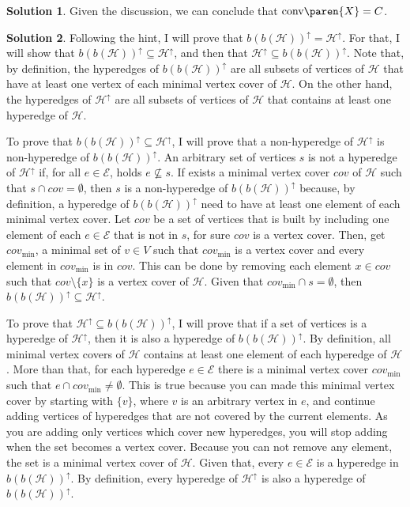 \documentclass[11pt,leqno,final]{amsart}
\theoremstyle{definition}
\newtheorem{solution}{Solution}
\begin{document}
\begin{solution}
Given the discussion, we can conclude that $\text{conv}\paren{X} = C$.


\end{solution}

\begin{solution}
Following the hint, I will prove that ${b(b(\mathcal{H}))}^{\uparrow} = \mathcal{H}^{\uparrow}$. For that, I will show that ${b(b(\mathcal{H}))}^{\uparrow} \subseteq \mathcal{H}^{\uparrow}$, and then that $\mathcal{H}^{\uparrow} \subseteq {b(b(\mathcal{H}))}^{\uparrow}$. Note that, by definition, the hyperedges of ${b(b(\mathcal{H}))}^{\uparrow}$ are all subsets of vertices of $\mathcal{H}$ that have at least one vertex of each minimal vertex cover of $\mathcal{H}$. On the other hand, the hyperedges of $\mathcal{H}^{\uparrow}$ are all subsets of vertices of $\mathcal{H}$ that contains at least one hyperedge of $\mathcal{H}$.

To prove that ${b(b(\mathcal{H}))}^{\uparrow} \subseteq \mathcal{H}^{\uparrow}$, I will prove that a non-hyperedge of $\mathcal{H}^{\uparrow}$ is non-hyperedge of ${b(b(\mathcal{H}))}^{\uparrow}$. An arbitrary set of vertices $s$ is not a hyperedge of ${\mathcal{H}}^{\uparrow}$ if, for all $e \in \mathcal{E}$, holds $e \nsubseteq s$. If exists a minimal vertex cover $cov$ of $\mathcal{H}$ such that $s \cap cov = \emptyset$, then $s$ is a non-hyperedge of $b(b(\mathcal{H}))^{\uparrow}$ because, by definition, a hyperedge of $b(b(\mathcal{H}))^{\uparrow}$ need to have at least one element of each minimal vertex cover. Let $cov$ be a set of vertices that is built by including one element of each $e \in \mathcal{E}$ that is not in $s$, for sure $cov$ is a vertex cover. Then, get $cov_{\text{min}}$, a minimal set of $v \in V$ such that $cov_{\text{min}}$ is a vertex cover and every element in $cov_{\text{min}}$ is in $cov$. This can be done by removing each element $x \in cov$ such that $cov \setminus \{x\}$ is a vertex cover of $\mathcal{H}$. Given that $cov_{\text{min}} \cap s = \emptyset$, then ${b(b(\mathcal{H}))}^{\uparrow} \subseteq \mathcal{H}^{\uparrow}$.

To prove that $\mathcal{H}^{\uparrow} \subseteq {b(b(\mathcal{H}))}^{\uparrow}$, I will prove that if a set of vertices is a hyperedge of ${\mathcal{H}}^{\uparrow}$, then it is also a hyperedge of ${b(b(\mathcal{H}))}^{\uparrow}$. By definition, all minimal vertex covers of $\mathcal{H}$ contains at least one element of each hyperedge of $\mathcal{H}$. More than that, for each hyperedge $e \in \mathcal{E}$ there is a minimal vertex cover $cov_{\text{min}}$ such that $e \cap cov_{\text{min}} \neq \emptyset$. This is true because you can made this minimal vertex cover by starting with $\{v\}$, where $v$ is an arbitrary vertex in $e$, and continue adding vertices of hyperedges that are not covered by the current elements. As you are adding only vertices which cover new hyperedges, you will stop adding when the set becomes a vertex cover. Because you can not remove any element, the set is a minimal vertex cover of $\mathcal{H}$. Given that, every $e \in \mathcal{E}$  is a hyperedge in ${b(b(\mathcal{H}))}^{\uparrow}$. By definition, every hyperedge of ${\mathcal{H}}^{\uparrow}$ is also a hyperedge of ${b(b(\mathcal{H}))}^{\uparrow}$.


\end{solution}
\end{document}

